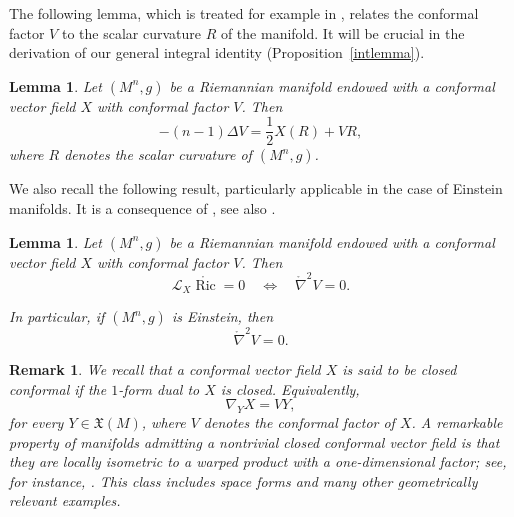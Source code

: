 \documentclass[reqno,11pt]{amsart}
\numberwithin{equation}{section}  %
\newtheorem{lemma}[theorem]{Lemma}
\newtheorem{remark}[theorem]{Remark}
\begin{document}
The following lemma, which is treated for example in \cite[Lemma 2.2]{andrade2025}, relates the conformal factor $V$ to the scalar curvature $R$ of the manifold. It will be crucial in the derivation of our general integral identity (Proposition~\ref{intlemma}).

\begin{lemma}\label{lemma1}
Let $(M^{n},g)$ be a Riemannian manifold endowed with a conformal vector field $X$ with conformal factor $V$. Then
\begin{equation}\label{Lapl_V}
-(n-1)\Delta V
=
\frac{1}{2}X(R)+VR,
\end{equation}
where $R$ denotes the scalar curvature of $(M^{n},g)$.
\end{lemma}


We also recall the following result, particularly applicable in the case of Einstein manifolds. It is a consequence of \cite[Lemma 2.1]{kr}, see also \cite[p.~160]{yano}.


\begin{lemma}\label{lemma_tracefree}
Let $(M^{n},g)$ be a Riemannian manifold endowed with a conformal vector field $X$ with conformal factor $V$. Then
\[
\mathcal{L}_{X}\mathring{\operatorname{Ric}}=0
\quad\Longleftrightarrow\quad
\mathring{\nabla}^{2}V=0.
\]

In particular, if $(M^{n},g)$ is Einstein, then
\[
\mathring{\nabla}^{2}V=0.
\]
\end{lemma}

\begin{remark}
We recall that a conformal vector field $X$ is said to be \emph{closed conformal} if the $1$-form dual to $X$ is closed. Equivalently,
\[
\nabla_YX = VY,
\]
for every $Y\in\mathfrak{X}(M)$, where $V$ denotes the conformal factor of $X$. A remarkable property of manifolds admitting a nontrivial closed conformal vector field is that they are locally isometric to a warped product with a one-dimensional factor; see, for instance, \cite[Section 3]{montiel}. This class includes space forms and many other geometrically relevant examples.
\end{remark}

\end{document}
